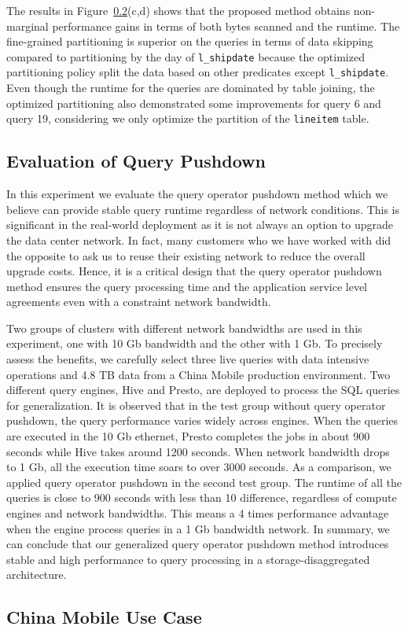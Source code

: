 The results  in Figure~\ref{}(c,d) shows that the proposed method obtains non-marginal performance gains in terms of both bytes scanned and the runtime. The fine-grained partitioning is superior on the queries in terms of data skipping compared to partitioning by the day of \texttt{l\_shipdate} because the optimized partitioning policy split the data based on other predicates except \texttt{l\_shipdate}. Even though the runtime for the queries are dominated by table joining, the optimized partitioning also demonstrated some improvements for query 6 and query 19, considering we only optimize the partition of the \texttt{lineitem} table. 




\subsection{Evaluation of Query Pushdown}
In this experiment we evaluate the query operator pushdown method which we believe can provide stable query runtime regardless of network conditions. This is significant in the real-world deployment as it is not always an option to upgrade the data center network. In fact, many customers who we have worked with did the opposite to ask us to reuse their existing network to reduce the overall upgrade costs. Hence, it is a critical design that the query operator pushdown method ensures the query processing time and the application service level agreements even with a constraint network bandwidth.

Two groups of clusters with different network bandwidths are used in this experiment, one with 10 Gb bandwidth and the other with 1 Gb. To precisely assess the benefits, we carefully select three live queries with data intensive operations and 4.8 TB data from a China Mobile production environment. Two different query engines, Hive and Presto, are deployed to process the SQL queries for generalization. It is observed that in the test group without query operator pushdown, the query performance varies widely across engines. When the queries are executed in the 10 Gb ethernet, Presto completes the jobs in about 900 seconds while Hive takes around 1200 seconds. When network bandwidth drops to 1 Gb, all the execution time soars to over 3000 seconds. As a comparison, we applied query operator pushdown in the second test group. The runtime of all the queries is close to 900 seconds with less than 10 difference, regardless of compute engines and network bandwidths. This means a 4 times performance advantage when the engine process queries in a 1 Gb bandwidth network. In summary, we can conclude that our generalized query operator pushdown method introduces stable and high performance to query processing in a storage-disaggregated architecture. 




\subsection{China Mobile Use Case}